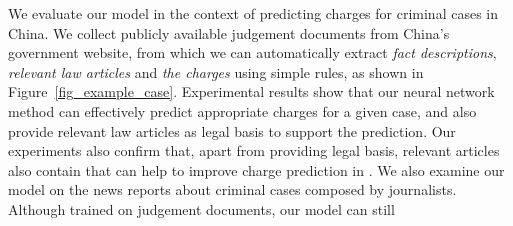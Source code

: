 We evaluate our model in the context of  predicting charges for criminal cases in China. 
We collect publicly available judgement documents from China's government website, 
from which we can automatically extract 
\textit{fact descriptions}, \textit{relevant law articles} and \textit{the charges} using simple rules, as shown in Figure~\ref{fig_example_case}.
Experimental results show that our neural network method can effectively predict appropriate charges for a given case, and also provide relevant law articles as legal basis to support the prediction. 
Our experiments also confirm that, apart from providing legal basis, relevant articles also contain  that can help to improve charge prediction in .
We also examine our model on the news reports about criminal cases composed by journalists.
Although trained on judgement documents, our model can still 




